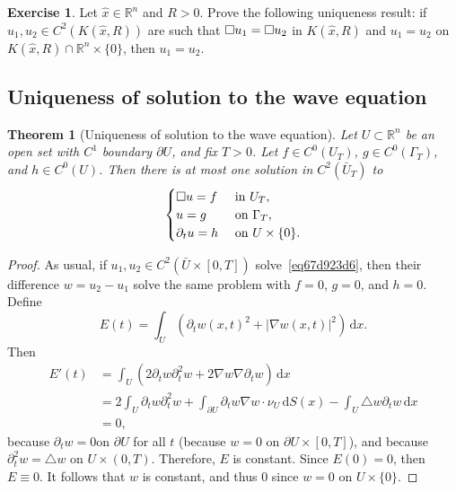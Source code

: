 \documentclass[a4paper,9pt]{amsart}
\newcommand{\R}{\mathbb{R}}	%
\newcommand{\did}{\,\mathrm{d}}	%
\newcommand{\de}{\partial}		%
\newcommand{\laplacian}{\triangle}
\newcommand{\grad}{\nabla}
\theoremstyle{plain}
\newtheorem{theorem}[proposition]{Theorem}
\theoremstyle{definition}
\newtheorem{exercise}[proposition]{Exercise}%
\theoremstyle{remark}
\begin{document}
\begin{exercise}
	Let $\hat x\in\R^n$ and $R>0$.
	Prove the following uniqueness result: if $u_1,u_2\in C^2(K(\hat x,R))$ are such that $\square u_1 = \square u_2$ in $K(\hat x,R)$ and $u_1=u_2$ on $K(\hat x,R) \cap \R^n\times\{0\}$, then $u_1 = u_2$.
\end{exercise}


\subsection{Uniqueness of solution to the wave equation}\label{subs67d92277}

\begin{theorem}[Uniqueness of solution to the wave equation]\label{thm67da8593}
	Let $U\subset\R^n$ be an open set with $C^1$ boundary $\de U$, and fix $T>0$.
	Let $f\in C^0(U_T)$, $g\in C^0(\Gamma_T)$, and $h\in C^0(U)$.
	Then there is at most one solution in $C^2(\bar U_T)$ to 
	\begin{equation}\label{eq67d923d6}
	\begin{cases}
		\waveop u = f & \text{ in } U_T , \\
		u = g & \text{ on }\Gamma_T , \\
		\de_t u = h & \text{ on } U\times\{0\} .
	\end{cases}
	\end{equation}
\end{theorem}
\begin{proof}
	As usual, if $u_1,u_2\in C^2(\bar U \times[0,T])$ solve~\eqref{eq67d923d6}, 
	then their difference $w = u_2-u_1$ solve the same problem with $f=0$, $g=0$, and $h=0$.
	Define
	\begin{equation}
		E(t) = \int_U (\de_tw(x,t)^2 + |\grad w(x,t)|^2) \did x .
	\end{equation}
	Then
	\begin{align*}
	 	E'(t)
		&= \int_U (2\de_tw \de_t^2w + 2 \grad w\grad\de_tw) \did x \\
		&= 2 \int_U\de_t w \de_t^2w + \int_{\de U} \de_t w \grad w\cdot \nu_U \did S(x) 
			- \int_U \laplacian w \de_tw \did x \\
		&= 0 ,
	\end{align*}
	because $\de_tw = 0 $on $\de U$ for all $t$ (because $w=0$ on $\de U\times [0,T]$),
	and because $\de_t^2 w = \laplacian w $ on $U\times(0,T)$.
	Therefore, $E$ is constant.
	Since $E(0)=0$, then $E\equiv 0$.
	It follows that $w$ is constant, and thus $0$ since $w=0$ on $U\times\{0\}$.
\end{proof}
\end{document}

